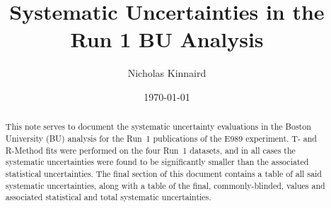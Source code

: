 \documentclass[12pt,letterpaper]{article}
\title{Systematic Uncertainties in the Run 1 BU \wa Analysis}
\author{Nicholas Kinnaird}
\date{\today}
\begin{document}
\maketitle

\begin{abstract}
	This note serves to document the systematic uncertainty evaluations in the Boston University (BU) analysis for the Run~1 publications of the E989 experiment. T- and R-Method fits were performed on the four Run~1 datasets, and in all cases the systematic uncertainties were found to be significantly smaller than the associated statistical uncertainties. The final section of this document contains a table of all said systematic uncertainties, along with a table of the final, commonly-blinded, \R values and associated statistical and total systematic uncertainties.
\end{abstract}

\tableofcontents












{}
\printbibliography

\end{document}
